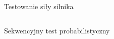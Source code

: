 \begin{frame}{Testowanie siły silnika}
\begin{columns}
\begin{column}{0.5\textwidth}
\begin{block}{Sekwencyjny test probabilistyczny}
            \end{block}
        \end{column}
    \end{columns}
\end{frame}